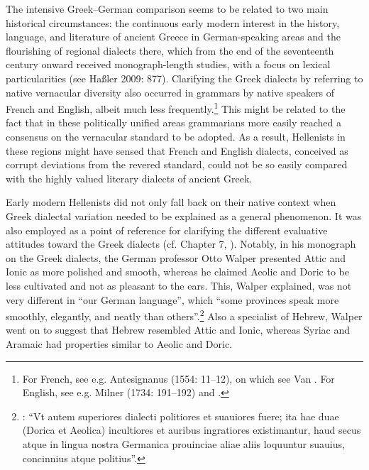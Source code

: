 The intensive Greek–German comparison seems to be related to two main historical circumstances: the continuous early modern interest in the history, language, and literature of ancient Greece in German-speaking areas and the flourishing of regional dialects there, which from the end of the seventeenth century onward received monograph-length studies, with a focus on lexical particularities (see Haßler 2009: 877). Clarifying the Greek dialects by referring to native vernacular diversity also occurred in grammars by native speakers of French and English, albeit much less frequently.\footnote{For French, see e.g. Antesignanus (1554: 11–12), on which see Van \citet{Rooy2016c}. For English, see e.g. Milner (1734: 191–192) and \citet[121]{Holmes1735}.} This might be related to the fact that in these politically unified areas grammarians more easily reached a consensus on the vernacular standard to be adopted. As a result, Hellenists in these regions might have sensed that French and English dialects, conceived as corrupt deviations from the revered standard, could not be so easily compared with the highly valued literary dialects of ancient Greek.

Early modern Hellenists did not only fall back on their native context when Greek dialectal variation needed to be explained as a general phenomenon. It was also employed as a point of reference for clarifying the different evaluative attitudes toward the Greek dialects (cf. Chapter 7, ). Notably, in his monograph on the Greek dialects, the German professor Otto Walper presented Attic and Ionic as more polished and smooth, whereas he claimed Aeolic and Doric to be less cultivated and not as pleasant to the ears. This, Walper explained, was not very different in “our German language”, which “some provinces speak more smoothly, elegantly, and neatly than others”.\footnote{\citet[61]{Walper1589}: “Vt autem superiores dialecti politiores et suauiores fuere; ita hae duae (Dorica et Aeolica) incultiores et auribus ingratiores existimantur, haud secus atque in lingua nostra Germanica prouinciae aliae aliis loquuntur suauius, concinnius atque politius”.} Also a specialist of Hebrew, Walper went on to suggest that Hebrew resembled Attic and Ionic, whereas Syriac and Aramaic had properties similar to Aeolic and Doric.

